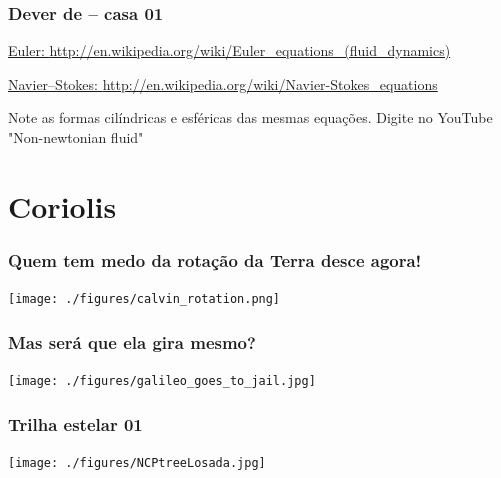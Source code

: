 \begin{frame}
\frametitle{Dever de -- casa 01}
    \begin{block}{}
      \href{http://en.wikipedia.org/wiki/Euler_equations_(fluid_dynamics)}{Euler: \url{http://en.wikipedia.org/wiki/Euler_equations_(fluid_dynamics)}}
    \end{block}

    \begin{block}{}
      \href{http://en.wikipedia.org/wiki/Navier-Stokes_equations}{Navier–Stokes: \url{http://en.wikipedia.org/wiki/Navier-Stokes_equations}}
    \end{block}
    {\scriptsize Note as formas cilíndricas e esféricas das mesmas equações.}
    {\scriptsize * Digite no YouTube "Non-newtonian fluid"}
\end{frame}

\section{Coriolis}
\begin{frame}
  \frametitle{Quem tem medo da rotação da Terra desce agora!}
  \begin{center}
    \texttt{[image: ./figures/calvin\_rotation.png]}
  \end{center}
\end{frame}


\begin{frame}
  \frametitle{Mas será que ela gira mesmo?}
  \begin{center}
    \texttt{[image: ./figures/galileo\_goes\_to\_jail.jpg]}
  \end{center}
\end{frame}


\begin{frame}
  \frametitle{Trilha estelar 01}
  \begin{center}
    \texttt{[image: ./figures/NCPtreeLosada.jpg]}
  \end{center}
\end{frame}


